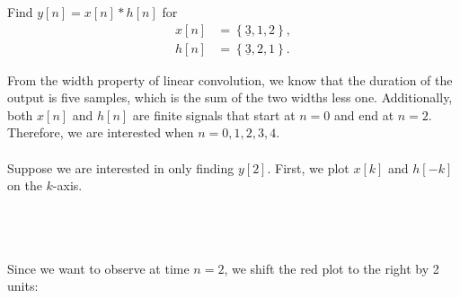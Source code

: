 \documentclass{report}
\begin{document}
\begin{example}
    Find $y[n]=x[n]*h[n]$ for 
    \begin{align*}
        x[n] &= \left\{\underline{3},1,2\right\}, \\
        h[n] &= \left\{\underline{3},2,1\right\}.
    \end{align*}
\end{example}
\begin{solution}
    From the width property of linear convolution, we know that the duration of the output is five samples, which is the sum of the two widths less one. 
    Additionally, both $x[n]$ and $h[n]$ are finite signals that start at $n=0$ and end at $n=2$. Therefore, we are interested when $n=0,1,2,3,4$.
    \\ \\
    Suppose we are interested in only finding $y[2]$. First, we plot $x[k]$ and $h[-k]$ on the $k$-axis.
    \\ \\
    \\ \\
    Since we want to observe at time $n=2$, we shift the red plot to the right by 2 units: \\ \\
    \\ \\

\end{solution}
\end{document}
